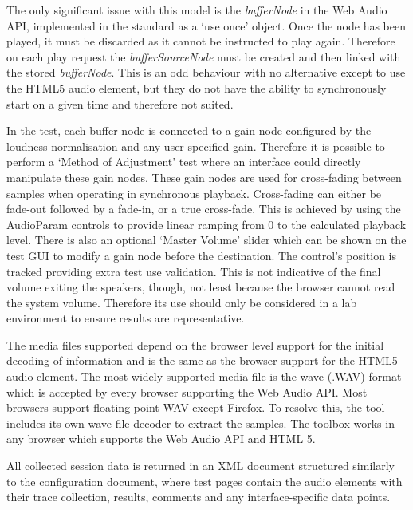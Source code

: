 \documentclass{sig-alternate}
\begin{document}
    The only significant issue with this model is the \textit{bufferNode} in the Web Audio API, implemented in the standard as a `use once' object. Once the node has been played, it must be discarded as it cannot be instructed to play again. Therefore on each play request the \textit{bufferSourceNode} must be created and then linked with the stored \textit{bufferNode}. This is an odd behaviour with no alternative except to use the HTML5 audio element, but they do not have the ability to synchronously start on a given time and therefore not suited.
    
    In the test, each buffer node is connected to a gain node configured by the loudness normalisation and any user specified gain. Therefore it is possible to perform a `Method of Adjustment' test where an interface could directly manipulate these gain nodes. These gain nodes are used for cross-fading between samples when operating in synchronous playback. Cross-fading can either be fade-out followed by a fade-in, or a true cross-fade. This is achieved by using the AudioParam controls to provide linear ramping from 0 to the calculated playback level. There is also an optional `Master Volume' slider which can be shown on the test GUI to modify a gain node before the destination. The control's position is tracked providing extra test use validation. This is not indicative of the final volume exiting the speakers, though, not least because the browser cannot read the system volume. Therefore its use should only be considered in a lab environment to ensure results are representative.
    
    The media files supported depend on the browser level support for the initial decoding of information and is the same as the browser support for the HTML5 audio element. The most widely supported media file is the wave (.WAV) format which is accepted by every browser supporting the Web Audio API. Most browsers support floating point WAV except Firefox. To resolve this, the tool includes its own wave file decoder to extract the samples. The toolbox works in any browser which supports the Web Audio API and HTML 5.
    
    All collected session data is returned in an XML document structured similarly to the configuration document, where test pages contain the audio elements with their trace collection, results, comments and any interface-specific data points.
    
\end{document}
